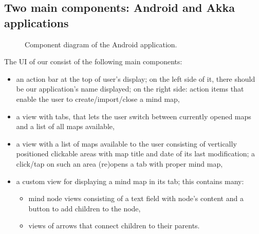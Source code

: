 %
%
%
%
%

\subsection{Two main components: Android and Akka applications}
\label{subsec:component-android}


\begin{figure}[h]
	\centering
	\caption{Component diagram of the Android application.}
	\label{fig:diagram-components-android}
\end{figure}

The UI of our consist of the following main components:

\begin{itemize}
	\item an action bar at the top of user's display; on the left side of it, there should be our application's name displayed; on the right side: action items that enable the user to create/import/close a mind map,
	\item a view with tabs, that lets the user switch between currently opened maps and a list of all maps available,
	\item a view with a list of maps available to the user consisting of vertically positioned clickable areas with map title and date of its last modification; a click/tap on such an area (re)opens a tab with proper mind map,
	\item a custom view for displaying a mind map in its tab; this contains many:\begin{itemize}
		\item mind node views consisting of a text field with node's content and a button to add children to the node,
		\item views of arrows that connect children to their parents.
	\end{itemize}
\end{itemize}

